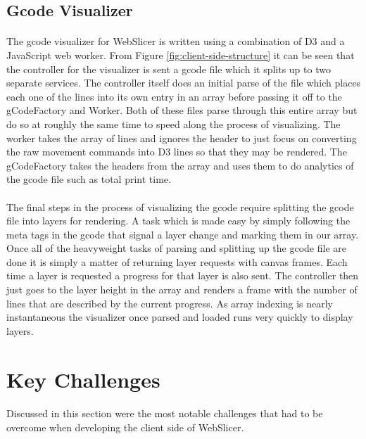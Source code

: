 \subsection{Gcode Visualizer}
\paragraph{}
The gcode visualizer for WebSlicer is written using a combination of D3 and a JavaScript web worker.
From Figure \ref{fig:client-side-structure} it can be seen that the controller for the visualizer is sent a gcode file which it splits up to two separate services.
The controller itself does an initial parse of the file which places each one of the lines into its own entry in an array before passing it off to the gCodeFactory and Worker.
Both of these files parse through this entire array but do so at roughly the same time to speed along the process of visualizing.
The worker takes the array of lines and ignores the header to just focus on converting the raw movement commands into D3 lines so that they may be rendered.
The gCodeFactory takes the headers from the array and uses them to do analytics of the gcode file such as total print time.

\paragraph{}
The final steps in the process of visualizing the gcode require splitting the gcode file into layers for rendering.
A task which is made easy by simply following the meta tags in the gcode that signal a layer change and marking them in our array.
Once all of the heavyweight tasks of parsing and splitting up the gcode file are done it is simply a matter of returning layer requests with canvas frames.
Each time a layer is requested a progress for that layer is also sent.
The controller then just goes to the layer height in the array and renders a frame with the number of lines that are described by the current progress.
As array indexing is nearly instantaneous the visualizer once parsed and loaded runs very quickly to display layers.

\section{Key Challenges}
\paragraph{}
Discussed in this section were the most notable challenges that had to be overcome when developing the client side of WebSlicer.

